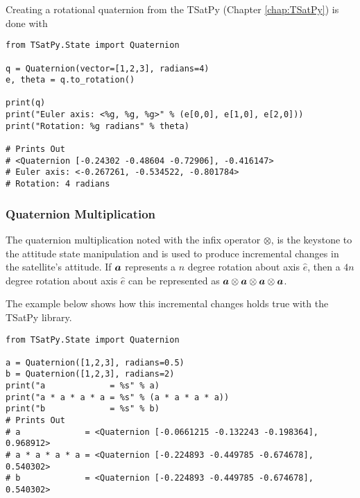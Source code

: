 Creating a rotational quaternion from the TSatPy (Chapter \ref{chap:TSatPy}) is done with

\begin{singlespace}
  \begin{verbatim}
from TSatPy.State import Quaternion

q = Quaternion(vector=[1,2,3], radians=4)
e, theta = q.to_rotation()

print(q)
print("Euler axis: <%g, %g, %g>" % (e[0,0], e[1,0], e[2,0]))
print("Rotation: %g radians" % theta)

# Prints Out
# <Quaternion [-0.24302 -0.48604 -0.72906], -0.416147>
# Euler axis: <-0.267261, -0.534522, -0.801784>
# Rotation: 4 radians
  \end{verbatim}
  \nocite{minted}
\end{singlespace}


\subsubsection{Quaternion Multiplication}
\label{subsubsec:QuaternionMultiplication}

The quaternion multiplication noted with the infix operator $\otimes$, is the keystone to the attitude state manipulation and is used to produce incremental changes in the satellite's attitude.  If $\boldsymbol{a}$ represents a $n$ degree rotation about axis $\hat{e}$, then a $4n$ degree rotation about axis $\hat{e}$ can be represented as $\boldsymbol{a} \otimes \boldsymbol{a} \otimes \boldsymbol{a} \otimes \boldsymbol{a}$.

The example below shows how this incremental changes holds true with the TSatPy library.

\begin{singlespace}
  \begin{verbatim}
from TSatPy.State import Quaternion

a = Quaternion([1,2,3], radians=0.5)
b = Quaternion([1,2,3], radians=2)
print("a             = %s" % a)
print("a * a * a * a = %s" % (a * a * a * a))
print("b             = %s" % b)
# Prints Out
# a             = <Quaternion [-0.0661215 -0.132243 -0.198364], 0.968912>
# a * a * a * a = <Quaternion [-0.224893 -0.449785 -0.674678], 0.540302>
# b             = <Quaternion [-0.224893 -0.449785 -0.674678], 0.540302>
  \end{verbatim}
  \nocite{minted}
\end{singlespace}

